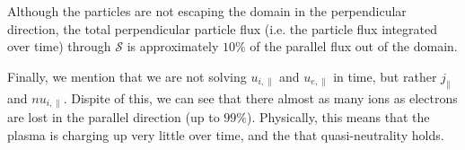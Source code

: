 Although the particles are not escaping the domain in the perpendicular direction, the total perpendicular particle flux (i.e. the particle flux integrated over time) through $\mathcal{S}$
is approximately $10\%$ of the parallel flux out of the domain.

Finally, we mention that we are not solving $u_{i,\|}$ and $u_{e,\|}$ in time, but rather $j_{\|}$ and $nu_{i,\|}$.
Dispite of this, we can see that there almost as many ions as electrons are lost in the parallel direction (up to $99\%$).
Physically, this means that the plasma is charging up very little over time, and the that quasi-neutrality holds.
